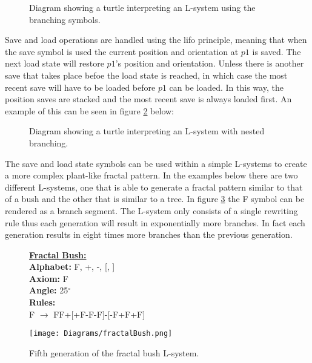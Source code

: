 \begin{figure}[htbp]
	{\centering
		\setlength{\fboxrule}{1pt}
		\vspace{7px}
		\caption{Diagram showing a turtle interpreting an L-system using the branching symbols.} \label{branching 1}
	}
\end{figure}
\FloatBarrier

\noindent
Save and load operations are handled using the \acrfull{lifo} principle, meaning that when the save symbol is used the current position and orientation at $p1$ is saved. The next load state will restore $p1$'s position and orientation. Unless there is another save that takes place befoe the load state is reached, in which case the most recent save will have to be loaded before $p1$ can be loaded. In this way, the position saves are stacked and the most recent save is always loaded first. An example of this can be seen in figure \ref{branching 2} below:

\begin{figure}[htbp]
	{\centering
		\setlength{\fboxrule}{1pt}
		\vspace{7px}
		\caption{Diagram showing a turtle interpreting an L-system with nested branching.} \label{branching 2}
	}
\end{figure}
\FloatBarrier

\noindent
The save and load state symbols can be used within a simple L-systems to create a more complex plant-like fractal pattern. In the examples below there are two different L-systems, one that is able to generate a fractal pattern similar to that of a bush and the other that is similar to a tree. In figure \ref{fractal bush} the F symbol can be rendered as a branch segment. The L-system only consists of a single rewriting rule thus each generation will result in exponentially more branches. In fact each generation results in eight times more branches than the previous generation. 

\begin{figure}[htbp]
	\raggedright
	\textbf{\underline{Fractal Bush:}} \\
	\textbf{Alphabet:} F, +, -, [, ] \\
	\textbf{Axiom:} F \\
	\textbf{Angle:} 25$^\circ$ \\
	\textbf{Rules:} \\
	F $\rightarrow$ FF+[+F-F-F]-[-F+F+F]\\
	{\centering
		\vspace{7px}
		\texttt{[image: Diagrams/fractalBush.png]}
		\caption{Fifth generation of the fractal bush L-system.} \label{fractal bush}
	}
\end{figure}
\FloatBarrier

